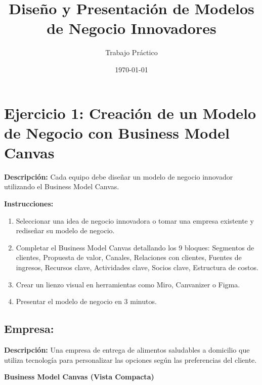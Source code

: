 \documentclass[a4paper,10pt]{article}
\title{Diseño y Presentación de Modelos de Negocio Innovadores}
\author{Trabajo Práctico}
\date{\today}
\begin{document}
\maketitle

\section*{Ejercicio 1: Creación de un Modelo de Negocio con Business Model Canvas}

\textbf{Descripción:} Cada equipo debe diseñar un modelo de negocio innovador utilizando el Business Model Canvas.

\textbf{Instrucciones:}
\begin{enumerate}
    \item Seleccionar una idea de negocio innovadora o tomar una empresa existente y rediseñar su modelo de negocio.
    \item Completar el Business Model Canvas detallando los 9 bloques: Segmentos de clientes, Propuesta de valor, Canales, Relaciones con clientes, Fuentes de ingresos, Recursos clave, Actividades clave, Socios clave, Estructura de costos.
    \item Crear un lienzo visual en herramientas como Miro, Canvanizer o Figma.
    \item Presentar el modelo de negocio en 3 minutos.
\end{enumerate}

\vspace{0.5cm}

\subsection{Empresa:}
\textbf{Descripción:} Una empresa de entrega de alimentos saludables a domicilio que utiliza tecnología para personalizar las opciones según las preferencias del cliente.

\begin{center}
\textbf{Business Model Canvas (Vista Compacta)}
\end{center}
\end{document}
